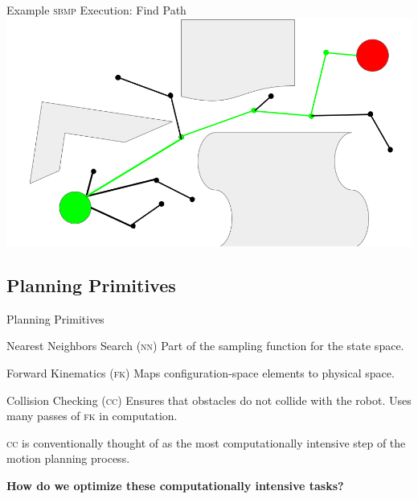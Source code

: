 \documentclass{beamer}
\begin{document}
\begin{frame}{Example \textsc{sbmp} Execution: Find Path}
\includegraphics[width=\textwidth]{./assets/rrt_slides/rrt_slides_8.png}
\end{frame}

\subsection{Planning Primitives}

\begin{frame}{Planning Primitives}
\pause
\begin{block}{Nearest Neighbors Search (\textsc{nn})}
Part of the sampling function for the state space.
\end{block}

\begin{block}{Forward Kinematics (\textsc{fk})}
Maps configuration-space elements to physical space.
\end{block}

\begin{block}{Collision Checking (\textsc{cc})}
Ensures that obstacles do not collide with the robot. Uses many passes of \textsc{fk} in computation. 
\end{block}

\textsc{cc} is conventionally thought of as the most computationally intensive step of the motion planning process.%

\end{frame}

\begin{frame}
\centering
\textbf{How do we optimize these computationally intensive tasks?}
\end{frame}
\end{document}
